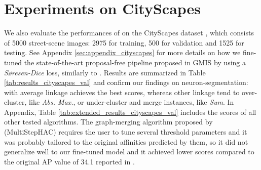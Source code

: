 \section{Experiments on CityScapes}\label{sec:cityscapes_exp}
We also evaluate the performances of \algname{} on the CityScapes dataset \cite{cordts2016cityscapes}, which consists of 5000 street-scene images: 2975 for training, 500 for validation and 1525 for testing.
See Appendix \ref{sec:appendix_cityscapes} for more details on how we fine-tuned the state-of-the-art proposal-free pipeline proposed in GMIS \cite{liu2018affinity} by using a \emph{S\o resen-Dice} loss, similarly to \cite{wolf2018mutex}.
Results are summarized in Table \ref{tab:results_cityscapes_val} and confirm our findings on neuron-segmentation: \algname{} with average linkage achieves the best scores, whereas other linkage tend to over-cluster, like \emph{Abs. Max.}, or under-cluster and merge instances, like \emph{Sum}. In Appendix, Table \ref{tab:extended_results_cityscapes_val} includes the scores of all other tested \algname{} algorithms. The graph-merging algorithm proposed by \cite{liu2018affinity} (MultiStepHAC) requires the user to tune several threshold parameters and it was probably tailored to the original affinities predicted by them, so it did not generalize well to our fine-tuned model and it achieved lower scores compared to the original AP value of 34.1 reported in \cite{liu2018affinity}.  
